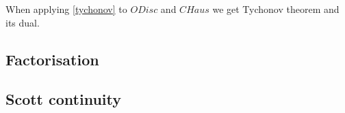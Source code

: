 When applying \cref{tychonov} to $ODisc$ and $CHaus$ we get Tychonov theorem and its dual.


\subsection{Factorisation}



\subsection{Scott continuity}

